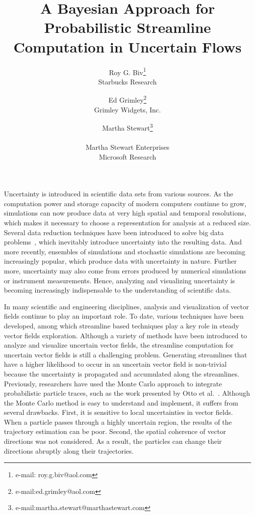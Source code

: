 \documentclass[review]{vgtc}                 %
\title{A Bayesian Approach for Probabilistic Streamline Computation in Uncertain Flows}
\author{Roy G. Biv\thanks{e-mail: roy.g.biv@aol.com}\\ %
        \scriptsize Starbucks Research %
\and Ed Grimley\thanks{e-mail:ed.grimley@aol.com}\\ %
     \scriptsize Grimley Widgets, Inc. %
\and Martha Stewart\thanks{e-mail:martha.stewart@marthastewart.com}\\ %
     \parbox{1.4in}{\scriptsize \centering Martha Stewart Enterprises \\ Microsoft Research}}
\begin{document}


\maketitle

Uncertainty is introduced in scientific data sets from various sources. As the computation power and storage capacity of modern computers continue to grow, simulations can now produce data at very high spatial and temporal resolutions, which makes it necessary to choose a representation for analysis at a reduced size. Several data reduction techniques have been introduced to solve big data problems~\cite{6378985, 7156380, conf/ldav/LiuLBP12, DBLP:conf/ldav/ThompsonLBBGPP11}, which inevitably introduce uncertainty into the resulting data. And more recently, ensembles of simulations and stochastic simulations are becoming increasingly popular, which produce data with uncertainty in nature. Further more, uncertainty may also come from errors produced by numerical simulations or instrument measurements. Hence, analyzing and visualizing uncertainty is becoming increasingly indispensable to the understanding of scientific data.

In many scientific and engineering disciplines, analysis and visualization of vector fields continue to play an important role. To date, various techniques have been developed, among which streamline based techniques play a key role in steady vector fields exploration. Although a variety of methods have been introduced to analyze and visualize uncertain vector fields, the streamline computation for uncertain vector fields is still a challenging problem. Generating streamlines that have a higher likelihood to occur in an uncertain vector field is non-trivial because the uncertainty is propagated and accumulated along the streamlines. Previously, researchers have used the Monte Carlo approach to integrate probabilistic particle traces, such as the work presented by Otto et al.~\cite{Otto10a, Otto11a}. Although the Monte Carlo method is easy to understand and implement, it suffers from several drawbacks. First, it is sensitive to local uncertainties in vector fields. When a particle passes through a highly uncertain region, the results of the trajectory estimation can be poor. Second, the spatial coherence of vector directions was not considered. As a result, the particles can change their directions abruptly along their trajectories.
\end{document}
